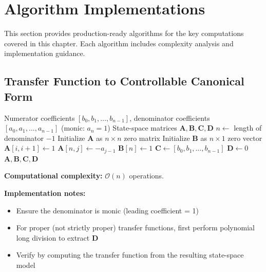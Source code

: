 \section{Algorithm Implementations}
\label{sec:algorithms}

This section provides production-ready algorithms for the key computations covered in this chapter. Each algorithm includes complexity analysis and implementation guidance.

\subsection{Transfer Function to Controllable Canonical Form}

\begin{algorithm}[H]
\caption{Transfer Function to Controllable Canonical Form}
\label{alg:tf_to_ccf}
\begin{algorithmic}[1]
\REQUIRE Numerator coefficients $[b_0, b_1, \ldots, b_{n-1}]$, denominator coefficients $[a_0, a_1, \ldots, a_{n-1}]$ (monic: $a_n = 1$)
\ENSURE State-space matrices $\mathbf{A}, \mathbf{B}, \mathbf{C}, \mathbf{D}$
\STATE $n \gets$ length of denominator $- 1$ 
\STATE Initialize $\mathbf{A}$ as $n \times n$ zero matrix
\STATE Initialize $\mathbf{B}$ as $n \times 1$ zero vector
\STATE
{}
    \STATE $\mathbf{A}[i, i+1] \gets 1$ 
\ENDFOR
{}
    \STATE $\mathbf{A}[n, j] \gets -a_{j-1}$ 
\ENDFOR
\STATE
\STATE $\mathbf{B}[n] \gets 1$ 
\STATE $\mathbf{C} \gets [b_0, b_1, \ldots, b_{n-1}]$ 
\STATE $\mathbf{D} \gets 0$
\STATE
\RETURN $\mathbf{A}, \mathbf{B}, \mathbf{C}, \mathbf{D}$
\end{algorithmic}
\end{algorithm}

\textbf{Computational complexity:} $\mathcal{O}(n)$ operations.

\textbf{Implementation notes:}
\begin{itemize}
    \item Ensure the denominator is monic (leading coefficient = 1)
    \item For proper (not strictly proper) transfer functions, first perform polynomial long division to extract $\mathbf{D}$
    \item Verify by computing the transfer function from the resulting state-space model
\end{itemize}

